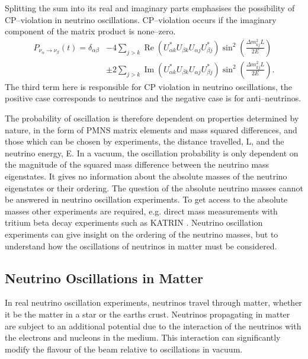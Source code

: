 Splitting the sum into its real and imaginary parts emphasises the possibility
of CP--violation in neutrino oscillations. CP--violation occurs if the imaginary
component of the matrix product is none--zero. 
\begin{align}
	\label{eqn:p_osc_im_re}
	P_{\nu_\alpha \rightarrow \nu_\beta}(t) = \delta_{\alpha \beta} 
	&- 4 \sum_{j > k} \operatorname{Re}(U^*_{\alpha k} U_{\beta k} U_{\alpha j} U^*_{\beta j}) \sin^2(\frac{\Delta m^2_{kj} L}{2E}) \nonumber \\
	&\pm 2 \sum_{j > k} \operatorname{Im}(U^*_{\alpha k} U_{\beta k} U_{\alpha j} U^*_{\beta j}) \sin^2(\frac{\Delta m^2_{kj} L}{2E}).
\end{align}
The third term here is responsible for CP violation in neutrino oscillations,
the positive case corresponds to neutrinos and the negative case is for
anti--neutrinos.

The probability of oscillation is therefore dependent on properties determined
by nature, in the form of PMNS matrix elements and mass squared differences, and
those which can be chosen by experiments, the distance travelled, L, and the
neutrino energy, E. In a vacuum, the oscillation probability is only dependent 
on the magnitude of the squared mass difference between the neutrino mass
eigenstates. It gives no information about the absolute masses of the 
neutrino eigenstates or their ordering. The question of the absolute
neutrino masses cannot be answered in neutrino oscillation experiments. To get
access to the absolute masses other experiments are required, e.g. direct mass
measurements with tritium beta decay experiments such as KATRIN 
\cite{Aker:2019qfn}.  Neutrino oscillation experiments can give insight on the 
ordering of the neutrino masses, but to understand how the oscillations of 
neutrinos in matter must be considered.

\subsection{Neutrino Oscillations in Matter}
In real neutrino oscillation experiments, neutrinos travel through matter,
whether it be the matter in a star or the earths crust. Neutrinos propagating in
matter are subject to an additional potential due to the interaction of the 
neutrinos with the electrons and nucleons in the medium.  This interaction can 
significantly modify the flavour of the beam relative to oscillations in 
vacuum.

